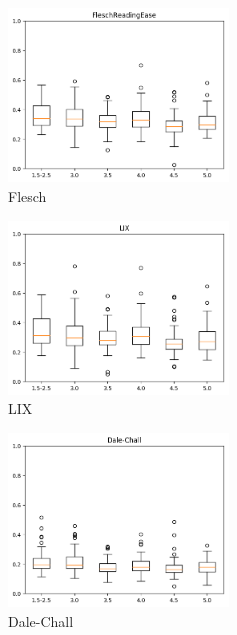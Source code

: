 \documentclass[12pt,journal,compsoc]{IEEEtran}
\begin{document}
\begin{center}
\begin{minipage}{\linewidth}
  \centering
  \begin{minipage}{0.25\linewidth}
      \begin{figure}[H]
          \includegraphics[width=2.3in]{../unigrams/scripts/boxplots/FleschReadingEase.png}
          \caption{Flesch}
      \end{figure}
  \end{minipage}
  \hspace{0.05\linewidth}
  \begin{minipage}{0.25\linewidth}
      \begin{figure}[H]
          \includegraphics[width=2.3in]{../unigrams/scripts/boxplots/LIX.png}
          \caption{LIX}
      \end{figure}
  \end{minipage}
  \hspace{0.05\linewidth}
  \begin{minipage}{0.25\linewidth}
      \begin{figure}[H]
          \includegraphics[width=2.3in]{../unigrams/scripts/boxplots/Dale-Chall.png}
          \caption{Dale-Chall}
      \end{figure}
  \end{minipage}
\end{minipage}
\end{center}
\end{document}
